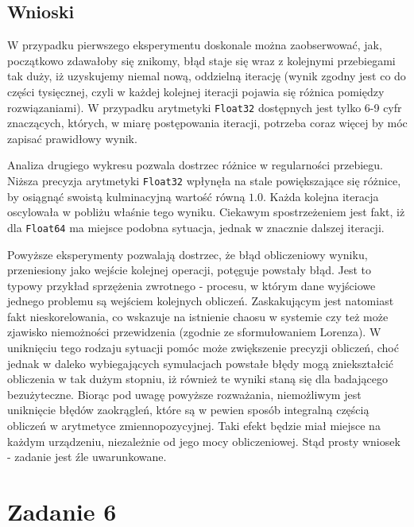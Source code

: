 \documentclass{classrep}
\begin{document}
	\subsection{Wnioski}
		W przypadku pierwszego eksperymentu doskonale można zaobserwować, jak, początkowo zdawałoby się znikomy, błąd staje się wraz z kolejnymi przebiegami tak duży, iż uzyskujemy niemal nową, oddzielną iterację (wynik zgodny jest co do części tysięcznej, czyli w każdej kolejnej iteracji pojawia się różnica pomiędzy rozwiązaniami). W przypadku arytmetyki \texttt{Float32} dostępnych jest tylko 6-9 cyfr znaczących, których, w miarę postępowania iteracji, potrzeba coraz więcej by móc zapisać prawidłowy wynik.

		Analiza drugiego wykresu pozwala dostrzec różnice w regularności przebiegu. Niższa precyzja arytmetyki \texttt{Float32} wpłynęła na stale powiększające się różnice, by osiągnąć swoistą kulminacyjną wartość równą $1.0$. Każda kolejna iteracja oscylowała w pobliżu właśnie tego wyniku.
		Ciekawym spostrzeżeniem jest fakt, iż dla \texttt{Float64} ma miejsce podobna sytuacja, jednak w znacznie dalszej iteracji. 
		
		Powyższe eksperymenty pozwalają dostrzec, że błąd obliczeniowy wyniku, przeniesiony jako wejście kolejnej operacji, potęguje powstały błąd. Jest to typowy przykład sprzężenia zwrotnego - procesu, w którym dane wyjściowe jednego problemu są wejściem kolejnych obliczeń. Zaskakującym jest natomiast fakt nieskorelowania, co wskazuje na istnienie chaosu w systemie czy też może zjawisko niemożności przewidzenia (zgodnie ze sformułowaniem Lorenza). W uniknięciu tego rodzaju sytuacji pomóc może zwiększenie precyzji obliczeń, choć jednak w daleko wybiegających symulacjach powstałe błędy mogą zniekształcić obliczenia w tak dużym stopniu, iż również te wyniki staną się dla badającego bezużyteczne. Biorąc pod uwagę powyższe rozważania, niemożliwym jest uniknięcie błędów zaokrągleń, które są w pewien sposób integralną częścią obliczeń w arytmetyce zmiennopozycyjnej. Taki efekt będzie miał miejsce na każdym urządzeniu, niezależnie od jego mocy obliczeniowej. Stąd prosty wniosek - zadanie jest źle uwarunkowane.
		
\section{Zadanie 6}
\end{document}
